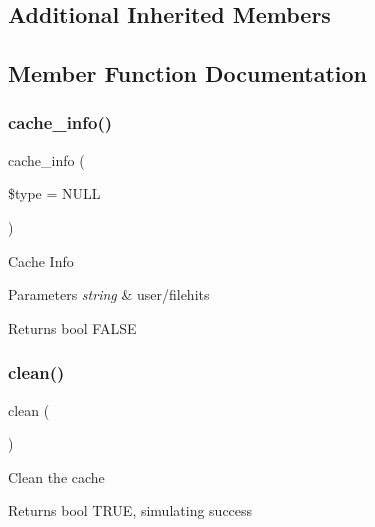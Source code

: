 \subsection*{Additional Inherited Members}


\subsection{Member Function Documentation}
\mbox{\label{class_c_i___cache__dummy_aa8b9c4d9f0387156736ccd8850f0727e}} 
\subsubsection{\texorpdfstring{cache\+\_\+info()}{cache\_info()}}
{\footnotesize\ttfamily cache\+\_\+info (\begin{DoxyParamCaption}\item[{}]{\$type = {\ttfamily NULL} }\end{DoxyParamCaption})}

Cache Info


\begin{DoxyParams}{Parameters}
{\em string} & user/filehits \\
\hline
\end{DoxyParams}
\begin{DoxyReturn}{Returns}
bool F\+A\+L\+SE 
\end{DoxyReturn}
\mbox{\label{class_c_i___cache__dummy_adb40b812890a8bc058bf6b7a0e1a54d9}} 
\subsubsection{\texorpdfstring{clean()}{clean()}}
{\footnotesize\ttfamily clean (\begin{DoxyParamCaption}{ }\end{DoxyParamCaption})}

Clean the cache

\begin{DoxyReturn}{Returns}
bool T\+R\+UE, simulating success 
\end{DoxyReturn}
\mbox{\label{class_c_i___cache__dummy_a4eb1c2772c8efc48c411ea060dd040b7}} 
